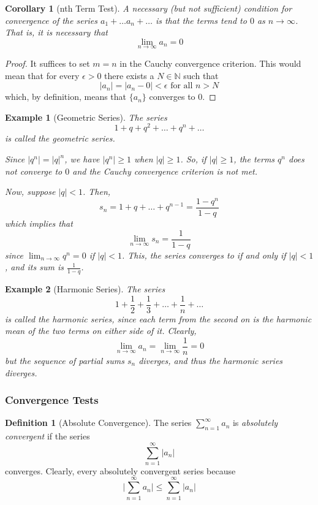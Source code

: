 \documentclass{article}
\newtheorem{example}{Example}[section]
\newtheorem{corollary}{Corollary}[theorem]
\theoremstyle{remark}
\theoremstyle{definition}
\newtheorem{definition}{Definition}[section]
\begin{document}
\begin{corollary}[nth Term Test]
A necessary (but not sufficient) condition for convergence of the series $a_1 + \ldots a_n + \ldots$ is that the terms tend to $0$ as $n \rightarrow \infty$. That is, it is necessary that
\[\lim_{n\rightarrow \infty} a_n = 0\]
\end{corollary}
\begin{proof}
It suffices to set $m = n$ in the Cauchy convergence criterion. This would mean that for every $\epsilon > 0$ there exists a $N \in \mathbb{N}$ such that 
\[|a_n| = |a_n - 0| < \epsilon \text{ for all } n > N\]
which, by definition, means that $\{a_n\}$ converges to $0$. 
\end{proof}

\begin{example}[Geometric Series]
The series 
\[1 + q + q^2 + \ldots + q^n + \ldots\]
is called the \textit{geometric series}. 

Since $|q^n| = |q|^n$, we have $|q^n| \geq 1$ when $|q| \geq 1$. So, if $|q| \geq 1$, the terms $q^n$ does not converge to $0$ and the Cauchy convergence criterion is not met. 

Now, suppose $|q|<1$. Then, 
\[s_n = 1 + q + \ldots + q^{n-1} = \frac{1 - q^n}{1-q}\]
which implies that
\[\lim_{n\rightarrow \infty} s_n = \frac{1}{1-q}\]
since $\lim_{n\rightarrow \infty} q^n = 0$ if $|q|<1$. This, the series converges to if and only if $|q|<1$, and its sum is $\frac{1}{1-q}$. 
\end{example}

\begin{example}[Harmonic Series]
The series 
\[1 + \frac{1}{2} + \frac{1}{3} + \ldots + \frac{1}{n} + \ldots\]
is called the \textit{harmonic series}, since each term from the second on is the harmonic mean of the two terms on either side of it. Clearly, 
\[\lim_{n \rightarrow \infty} a_n = \lim_{n \rightarrow \infty} \frac{1}{n} = 0\]
but the sequence of partial sums $s_n$ diverges, and thus the harmonic series diverges. 
\end{example}

\subsubsection{Convergence Tests}

\begin{definition}[Absolute Convergence]
The series $\sum_{n=1}^\infty a_n$ is \textit{absolutely convergent} if the series 
\[\sum_{n=1}^\infty |a_n|\]
converges. Clearly, every absolutely convergent series because 
\[\bigg|\sum_{n=1}^\infty a_n \bigg| \leq \sum_{n=1}^\infty |a_n|\]
\end{definition}
\end{document}
